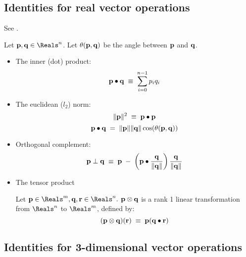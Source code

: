 \label{sec:general}



\subsection{Identities for real vector operations}
\label{sec:RX}

See \cite[p. 85, ex. 4-9]{spivak-1965}.

Let $\p, \q \in \Reals^{n}$.
Let $\theta({\mathbf p},{\mathbf q})$ be the angle between ${\mathbf p}$ and ${\mathbf q}$.

\begin{itemize}
\item The inner (dot) product:
\begin{equation}
{\mathbf p} \bullet {\mathbf q} \; \equiv \; \sum_{i=0}^{n-1} p_i q_i
\end{equation}

\item The euclidean ($l_2$) norm:
\begin{equation}
\| {\mathbf p} \|^2 \; \equiv \; {\mathbf p} \bullet {\mathbf p}
\end{equation}
\begin{equation}
{\mathbf p} \bullet {\mathbf q} \; = \; \| {\mathbf p} \| \| {\mathbf q} \| \cos(\theta({\mathbf p},{\mathbf q}))
\end{equation}

\item Orthogonal complement:
\begin{equation}
{\mathbf p} \perp {\mathbf q} \; \equiv \; {\mathbf p} \; - \; \left( {\mathbf p} \bullet \frac{{\mathbf q}}{\|{\mathbf q}\|}\right) \frac{{\mathbf q}}{\|{\mathbf q}\|}
\end{equation}

\item The tensor product

Let $\p \in \Reals^m, \q, \r \in \Reals^n.$
${\mathbf p} \otimes {\mathbf q}$ is a rank 1 linear transformation
from $\Reals^n$ to $\Reals^m$, defined by:
\begin{equation}
({\mathbf p} \otimes {\mathbf q})({\mathbf r}) \; \equiv \; {\mathbf p} ({\mathbf q} \bullet {\mathbf r})
\end{equation}

\end{itemize}


\subsection{Identities for 3-dimensional vector operations}
\label{sec:R3X}

